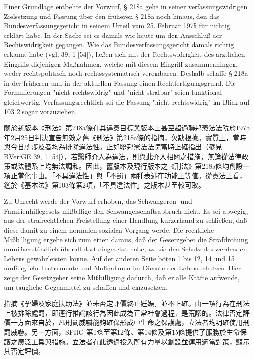 \documentclass[12pt]{article}
\begin{document}
\begin{sourcepara}[title={原文C.20}]
Einer Grundlage entbehre der Vorwurf, § 218a \abbrStGB{} \abbrNF{} gehe in seiner verfassungswidrigen Zielsetzung und Fassung über den früheren § 218a \abbrStGB{} noch hinaus, den das Bundesverfassungsgericht in seinem Urteil vom 25. Februar 1975 für nichtig erklärt habe. In der Sache sei es damals wie heute um den Ausschluß der Rechtswidrigkeit gegangen. Wie das Bundesverfassungsgericht damals richtig erkannt habe (vgl. \abbrBVerfGE{} 39, 1 [54]), ließen sich mit der Rechtswidrigkeit des ärztlichen Eingriffs diejenigen Maßnahmen, welche mit diesem Eingriff zusammenhingen, weder rechtspolitisch noch rechtssystematisch vereinbaren. Deshalb schaffe § 218a \abbrStGB{} in der früheren und in der aktuellen Fassung einen Rechtfertigungsgrund. Die Formulierungen "nicht rechtswidrig" und "nicht strafbar" seien funktional gleichwertig. Verfassungsrechtlich sei die Fassung "nicht rechtswidrig" im Blick auf \abbrArt{} 103 \abbrAbs{} 2 \abbrGG{}\ggfnArtOneZeroThreeTwoDE{} sogar vorzuziehen.
\end{sourcepara}
\begin{transpara}
關於新版本《刑法》第218a條在其違憲目標與版本上甚至超過聯邦憲法法院於1975年2月25日判決宣告無效之舊《刑法》第218a條的指摘，欠缺根據。實質上，當時與今日所涉及者均為排除違法性。正如聯邦憲法法院當時正確指出（參見 BVerfGE 39, 1 [54]），若醫師介入為違法，則與此介入相關之措施，無論從法律政策或法體系上均無法調和。因此，舊版本及現行版本之《刑法》第218a條均創設一項正當化事由。「不具違法性」與「不罰」兩種表述在功能上等值。從憲法上看，鑑於《基本法》第103條第2項\ggfnArtOneZeroThreeTwoZH{}，「不具違法性」之版本甚至較可取。
\end{transpara}

\begin{sourcepara}[title={原文C.21}]
Zu Unrecht werde der Vorwurf erhoben, das Schwangeren- und Familienhilfegesetz mißbillige den Schwangerschaftsabbruch nicht. Es sei abwegig, aus der strafrechtlichen Freistellung einer Handlung kurzerhand zu schließen, daß diese damit zu einem normalen sozialen Vorgang werde. Die rechtliche Mißbilligung ergebe sich zum einen daraus, daß der Gesetzgeber die Strafdrohung unmißverständlich überall dort eingesetzt habe, wo sie den Schutz des werdenden Lebens gewährleisten könne. Auf der anderen Seite böten \abbrArt{} 1 bis 12, \abbrArt{} 14 und 15 \abbrSFHG{} umfängliche Instrumente und Maßnahmen im Dienste des Lebensschutzes. Hier zeige der Gesetzgeber seine Mißbilligung dadurch, daß er alle Kräfte aufwende, um taugliche Gegenmittel zu schaffen und einzusetzen.
\end{sourcepara}
\begin{transpara}
指摘《孕婦及家庭扶助法》並未否定評價終止妊娠，並不正確。由一項行為在刑法上被排除處罰，即逕行推論該行為因此成為正常社會過程，是荒謬的。法律否定評價一方面來自於，凡刑罰威嚇能夠確保形成中生命之保護處，立法者均明確使用刑罰威嚇。另一方面，SFHG 第1條至第12條、第14條及第15條提供了服務於生命保護之廣泛工具與措施。立法者在此透過投入所有力量以創設並運用適當對策，顯示其否定評價。
\end{transpara}
\end{document}
